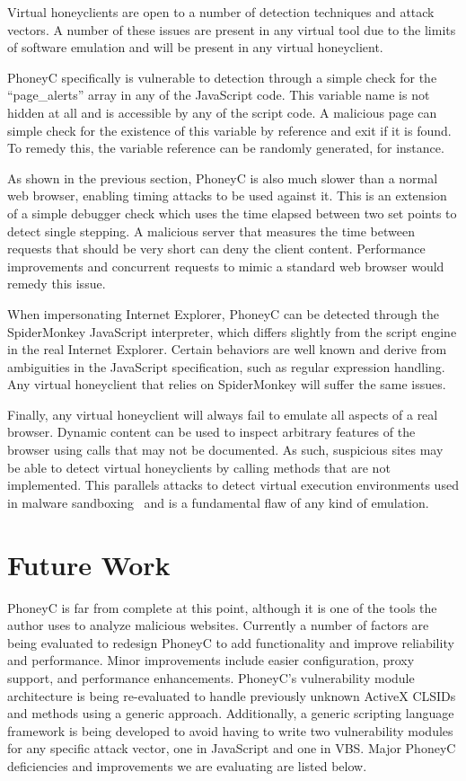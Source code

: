 \documentclass[10pt,twocolumn]{article}
\begin{document}
Virtual honeyclients are open to a number of detection techniques and attack vectors. A number of these issues are present in any virtual tool due to the limits of software emulation and will be present in any virtual honeyclient. 

PhoneyC specifically is vulnerable to detection through a simple check for the ``page\_alerts'' array in any of the JavaScript code. This variable name is not hidden at all and is accessible by any of the script code. A malicious page can simple check for the existence of this variable by reference and exit if it is found. To remedy this, the variable reference can be randomly generated, for instance.

As shown in the previous section, PhoneyC is also much slower than a normal web browser, enabling timing attacks to be used against it. This is an extension of a simple debugger check which uses the time elapsed between two set points to detect single stepping. A malicious server that measures the time between requests that should be very short can deny the client content. Performance improvements and concurrent requests to mimic a standard web browser would remedy this issue.

When impersonating Internet Explorer, PhoneyC can be detected through the SpiderMonkey JavaScript interpreter, which differs slightly from the script engine in the real Internet Explorer. Certain behaviors are well known and derive from ambiguities in the JavaScript specification, such as regular expression handling. Any virtual honeyclient that relies on SpiderMonkey will suffer the same issues. 

Finally, any virtual honeyclient will always fail to emulate all aspects of a real browser. Dynamic content can be used to inspect arbitrary features of the browser using calls that may not be documented. As such, suspicious sites may be able to detect virtual honeyclients by calling methods that are not implemented. This parallels attacks to detect virtual execution environments used in malware sandboxing~\cite{natvig:2008} and is a fundamental flaw of any kind of emulation.

\section{Future Work}
\label{future-work}

PhoneyC is far from complete at this point, although it is one of the tools the author uses to analyze malicious websites. Currently a number of factors are being evaluated to redesign PhoneyC to add functionality and improve reliability and performance. Minor improvements include easier configuration, proxy support, and performance enhancements. PhoneyC's vulnerability module architecture is being re-evaluated to handle previously unknown ActiveX CLSIDs and methods using a generic approach. Additionally, a generic scripting language framework is being developed to avoid having to write two vulnerability modules for any specific attack vector, one in JavaScript and one in VBS. Major PhoneyC deficiencies and improvements we are evaluating are listed below.
\end{document}
